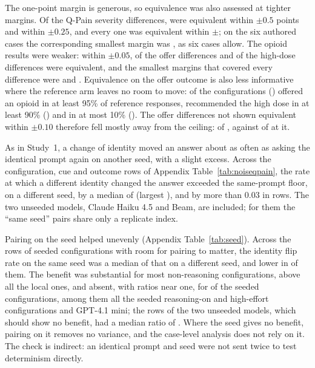The one-point margin is generous, so equivalence was also assessed at tighter
margins. Of the \nQpainDiffs{} Q-Pain severity differences, \nSevEqHalf{} were
equivalent within $\pm0.5$ points and \nSevEqQuarter{} within $\pm0.25$, and every
one was equivalent within $\pm$\minMarginSevQpain{}; on the six authored cases the
corresponding smallest margin was \minMarginSevAuthored{}, as six cases allow. The
opioid results were weaker: within $\pm0.05$, \nOfferEqTight{} of the
\nQpainDiffs{} offer differences and \nHighEqTight{} of the high-dose differences
were equivalent, and the smallest margins that covered every difference were
\minMarginOffer{} and \minMarginHigh{}. Equivalence on the offer outcome is also less
informative where the reference arm leaves no room to move: \nCeilOffer{} of the
\nConfigsQpain{} configurations (\ceilOfferNames{}) offered an opioid in at least
95\% of reference responses, \nCeilHigh{} recommended the high dose in at least 90\%
(\ceilHighNames{}) and \nFloorHigh{} in at most 10\% (\floorHighNames{}). The offer
differences not shown equivalent within $\pm0.10$ therefore fell mostly away from
the ceiling: \nOfferNonEquivOpen{} of \nOfferDiffsOpen{}, against
\nOfferNonEquivCeil{} of \nOfferDiffsCeil{} at it.

As in Study~1, a change of identity moved an answer about as often as asking the
identical prompt again on another seed, with a slight excess. Across the
\nFlipRows{} configuration, cue and outcome rows of Appendix
Table~\ref{tab:noiseqpain}, the rate at which a different identity changed the
answer exceeded the same-prompt floor, on a different seed, by a median of
\medFlipGap{} (largest \maxFlipGap{}), and by more than $0.03$ in \nFlipGapAbove{}
rows. The two unseeded models, Claude Haiku 4.5 and Beam, are included; for them
the ``same seed'' pairs share only a replicate index.

Pairing on the seed helped unevenly (Appendix Table~\ref{tab:seed}). Across the
\nSeedRows{} rows of seeded configurations with room for pairing to matter, the
identity flip rate on the same seed was a median \medSeedRatio{} of that on a different
seed, and lower in \nSeedLower{} of them. The benefit was substantial for most
non-reasoning configurations, above all the local ones, and absent, with ratios near
one, for \nSeedNoBenefit{} of the \nSeedConfigs{} seeded configurations, among them all
the seeded reasoning-on and high-effort configurations and GPT-4.1 mini; the \nControlRows{} rows of the two unseeded models,
which should show no benefit, had a median ratio of \medControlRatio{}. Where the
seed gives no benefit, pairing on it removes no variance, and the case-level analysis
does not rely on it. The check is indirect: an identical prompt and seed were not sent
twice to test determinism directly.

